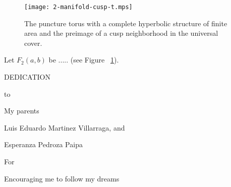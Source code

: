 \documentclass[12pt]{report}
\theoremstyle{definition}
\theoremstyle{remark}
\numberwithin{equation}{chapter}
\numberwithin{figure}{chapter}
\begin{document}
\begin{figure}[ht]
\begin{center}
\texttt{[image: 2-manifold-cusp-t.mps]}
\end{center}
\caption[Punctured torus group as a relatively hyperbolic group]
{The puncture torus with a complete hyperbolic structure of finite area and the preimage of a cusp neighborhood in the universal cover.}
\label{fig:2-manifold}
\end{figure}

Let $F_2(a, b)$ be .....  (see Figure ~\ref{fig:2-manifold}).



{
\singlespacing



}



\newpage
{}

\thispagestyle{empty}
{\singlespacing
\begin{center}
{
\par
\vspace{1.2in}
DEDICATION
\par
\vspace{0.17in}
to
\par
\vspace{1.2in}
My parents
\par
\vspace{0.17in}
Luis Eduardo Martinez Villarraga, and
\par
\vspace{0.17in}
Esperanza Pedroza Paipa
\par
\vspace{1.2in}
For
\par
\vspace{0.17in}
Encouraging me to follow my dreams
\par
\vfill
}
\end{center}
}
\end{document}
